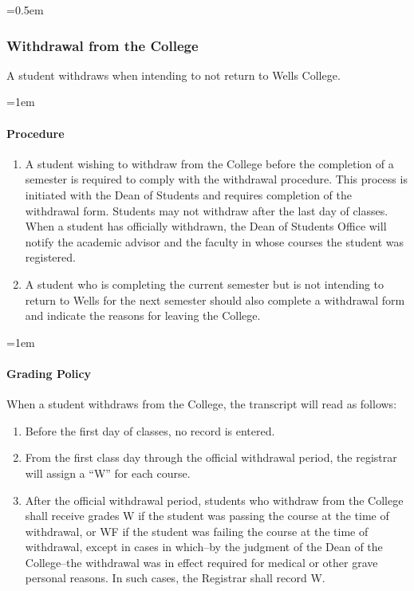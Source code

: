 \documentclass{manual}
\newcommand{\modified}[1]{}
\newcommand{\oldbreak}[1]{}
\let\oldsubsubsection\subsubsection
\renewcommand\subsubsection{\leftskip=0.5em\oldsubsubsection}
\let\oldparagraph\paragraph
\renewcommand\paragraph{\leftskip=1em\oldparagraph}
\begin{document}
\subsubsection{Withdrawal from the College}\label{sub:WithdrawlFromTheCollege}

A student withdraws when intending to not return to Wells College.

\paragraph{Procedure}
\begin{enumerate}[label=\alph*)]
\item A student wishing to withdraw from the College before the completion of a semester is required to comply with the withdrawal procedure. This process is initiated with the Dean of Students and requires completion of the withdrawal form. Students may not withdraw after the last day of classes. When a student has officially withdrawn, the Dean of Students Office will notify the academic advisor and the faculty in whose courses the student was registered.

\item A student who is completing the current semester but is not intending to return to Wells for the next semester should also complete a withdrawal form and indicate the reasons for leaving the College.
\end{enumerate}
\paragraph{Grading Policy}

When a student withdraws from the College, the transcript will read as follows:

\begin{enumerate}[label=\alph*)]

\item Before the first day of classes, no record is entered.

\item From the first class day through the official withdrawal period, the registrar will assign a ``W'' for each course.

\oldbreak{IX-2}

\item After the official withdrawal period, students who withdraw from the College shall \modified{2/12/02 } receive grades W if the student was passing the course at the time of withdrawal, or WF if the student was failing the course at the time of withdrawal, except in cases in which--by the judgment of the Dean of the College--the withdrawal was in effect required for medical or other grave personal reasons. In such cases, the Registrar shall record W.

\end{enumerate}
\end{document}
